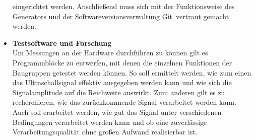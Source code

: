 \begin{itemize}
eingerichtet werden. Anschließend muss sich mit der Funktionsweise des Generators und der Softwareversionsverwaltung \glqq Git\grqq~vertraut gemacht werden.
\item \textbf{Testsoftware und Forschung}\\
Um Messungen an der Hardware durchführen zu können gilt es Programmblöcke zu entwerfen, mit denen die einzelnen Funktionen der Baugruppen getestet werden können. So soll ermittelt werden, wie zum einen das Ultraschallsignal effektiv ausgegeben werden kann und wie sich die Signalamplitude auf die Reichweite auswirkt. Zum anderen gilt es zu recherchieren, wie das zurückkommende Signal verarbeitet werden kann. Auch soll erarbeitet werden, wie gut das Signal unter verschiedenen Bedingungen verarbeitet werden kann und ob eine zuverlässige Verarbeitungsqualität ohne großen Aufwand realisierbar ist.
\end{itemize}